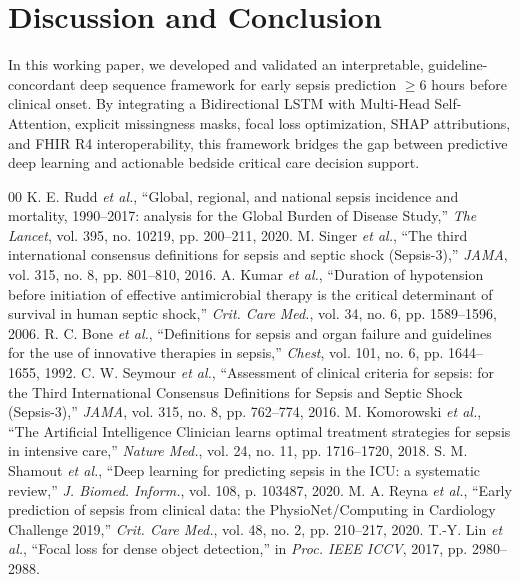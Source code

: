 \documentclass[conference]{IEEEtran}
\begin{document}
\section{Discussion and Conclusion}
In this working paper, we developed and validated an interpretable, guideline-concordant deep sequence framework for early sepsis prediction $\ge 6$ hours before clinical onset. By integrating a Bidirectional LSTM with Multi-Head Self-Attention, explicit missingness masks, focal loss optimization, SHAP attributions, and FHIR R4 interoperability, this framework bridges the gap between predictive deep learning and actionable bedside critical care decision support.


\begin{thebibliography}{00}
 K. E. Rudd \textit{et al.}, ``Global, regional, and national sepsis incidence and mortality, 1990--2017: analysis for the Global Burden of Disease Study,'' \textit{The Lancet}, vol. 395, no. 10219, pp. 200--211, 2020.
 M. Singer \textit{et al.}, ``The third international consensus definitions for sepsis and septic shock (Sepsis-3),'' \textit{JAMA}, vol. 315, no. 8, pp. 801--810, 2016.
 A. Kumar \textit{et al.}, ``Duration of hypotension before initiation of effective antimicrobial therapy is the critical determinant of survival in human septic shock,'' \textit{Crit. Care Med.}, vol. 34, no. 6, pp. 1589--1596, 2006.
 R. C. Bone \textit{et al.}, ``Definitions for sepsis and organ failure and guidelines for the use of innovative therapies in sepsis,'' \textit{Chest}, vol. 101, no. 6, pp. 1644--1655, 1992.
 C. W. Seymour \textit{et al.}, ``Assessment of clinical criteria for sepsis: for the Third International Consensus Definitions for Sepsis and Septic Shock (Sepsis-3),'' \textit{JAMA}, vol. 315, no. 8, pp. 762--774, 2016.
 M. Komorowski \textit{et al.}, ``The Artificial Intelligence Clinician learns optimal treatment strategies for sepsis in intensive care,'' \textit{Nature Med.}, vol. 24, no. 11, pp. 1716--1720, 2018.
 S. M. Shamout \textit{et al.}, ``Deep learning for predicting sepsis in the ICU: a systematic review,'' \textit{J. Biomed. Inform.}, vol. 108, p. 103487, 2020.
 M. A. Reyna \textit{et al.}, ``Early prediction of sepsis from clinical data: the PhysioNet/Computing in Cardiology Challenge 2019,'' \textit{Crit. Care Med.}, vol. 48, no. 2, pp. 210--217, 2020.
 T.-Y. Lin \textit{et al.}, ``Focal loss for dense object detection,'' in \textit{Proc. IEEE ICCV}, 2017, pp. 2980--2988.
\end{thebibliography}
\end{document}
